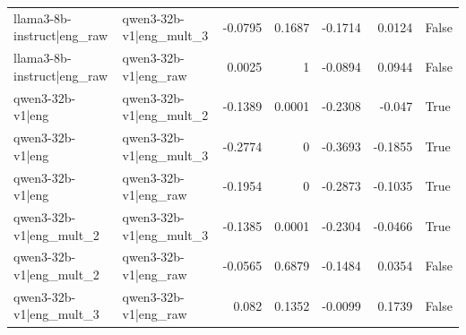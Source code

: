 \begin{table}
\begin{tabular}{l l r r r r l}
llama3-8b-instruct|eng_raw & qwen3-32b-v1|eng_mult_3 & -0.0795 & 0.1687 & -0.1714 & 0.0124 & False \\
llama3-8b-instruct|eng_raw & qwen3-32b-v1|eng_raw & 0.0025 & 1 & -0.0894 & 0.0944 & False \\
qwen3-32b-v1|eng & qwen3-32b-v1|eng_mult_2 & -0.1389 & 0.0001 & -0.2308 & -0.047 & True \\
qwen3-32b-v1|eng & qwen3-32b-v1|eng_mult_3 & -0.2774 & 0 & -0.3693 & -0.1855 & True \\
qwen3-32b-v1|eng & qwen3-32b-v1|eng_raw & -0.1954 & 0 & -0.2873 & -0.1035 & True \\
qwen3-32b-v1|eng_mult_2 & qwen3-32b-v1|eng_mult_3 & -0.1385 & 0.0001 & -0.2304 & -0.0466 & True \\
qwen3-32b-v1|eng_mult_2 & qwen3-32b-v1|eng_raw & -0.0565 & 0.6879 & -0.1484 & 0.0354 & False \\
qwen3-32b-v1|eng_mult_3 & qwen3-32b-v1|eng_raw & 0.082 & 0.1352 & -0.0099 & 0.1739 & False \\
\bottomrule
\end{tabular}
\end{table}

